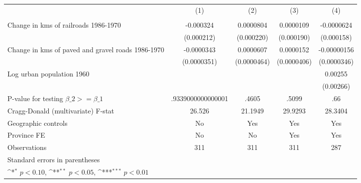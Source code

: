 {
\def\sym#1{\ifmmode^{#1}\else\(^{#1}\)\fi}
\begin{tabular}{l*{4}{c}}
\hline\hline
                &\multicolumn{1}{c}{(1)}&\multicolumn{1}{c}{(2)}&\multicolumn{1}{c}{(3)}&\multicolumn{1}{c}{(4)}\\
                &\multicolumn{1}{c}{}&\multicolumn{1}{c}{}&\multicolumn{1}{c}{}&\multicolumn{1}{c}{}\\
\hline
Change in kms of railroads 1986-1970&-0.000324         &0.0000804         &0.0000109         &-0.0000624         \\
                &(0.000212)         &(0.000220)         &(0.000190)         &(0.000158)         \\
[1em]
Change in kms of paved and gravel roads 1986-1970&-0.0000343         &0.0000607         &0.0000152         &-0.00000156         \\
                &(0.0000351)         &(0.0000464)         &(0.0000406)         &(0.0000346)         \\
[1em]
Log urban population 1960&                  &                  &                  &  0.00255         \\
                &                  &                  &                  &(0.00266)         \\
\hline
P-value for testing $\beta\_{2} >= \beta\_{1}$&.9339000000000001         &    .4605         &    .5099         &      .66         \\
Cragg-Donald (multivariate) F-stat&   26.526         &  21.1949         &  29.9293         &  28.3404         \\
Geographic controls&       No         &      Yes         &      Yes         &      Yes         \\
Province FE     &       No         &       No         &      Yes         &      Yes         \\
Observations    &      311         &      311         &      311         &      287         \\
\hline\hline
\multicolumn{5}{l}{\footnotesize Standard errors in parentheses}\\
\multicolumn{5}{l}{\footnotesize \sym{*} \(p<0.10\), \sym{**} \(p<0.05\), \sym{***} \(p<0.01\)}\\
\end{tabular}
}
